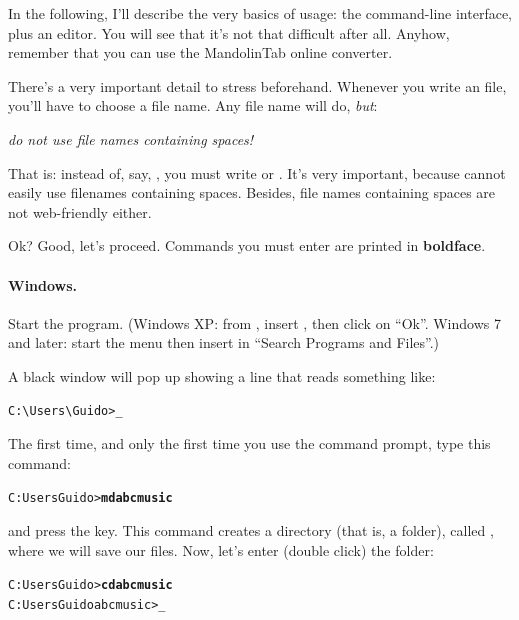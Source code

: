 \documentclass[a4paper,12pt]{book}
\begin{document}
In the following, I'll describe the very basics of \ABC{} usage: the
command-line interface, plus an editor. You will see that it's not
that difficult after all. Anyhow, remember that you can use the
MandolinTab online converter.

There's a very important detail to stress beforehand. Whenever you
write an \ABC{} file, you'll have to choose a file name. Any file name
will do, \emph{but}:

\begin{vimp}

  \emph{do not use file names containing spaces!}

\end{vimp}

That is: instead of, say, , you must write
 or . It's
very important, because \abcm{} cannot easily use filenames containing
spaces. Besides, file names containing spaces are not web-friendly
either.

Ok? Good, let's proceed. Commands you must enter are printed in
\textbf{boldface}.


\paragraph{Windows.}

Start the  program. (Windows XP: from
, insert , then click on ``Ok''.
Windows 7 and later: start the menu then insert  in ``Search
Programs and Files''.)

A black window will pop up showing a line that reads something like:

\begin{verbatim}
C:\Users\Guido>_
\end{verbatim}

The first time, and only the first time you use the command prompt,
type this command:

\begin{alltt}
C:\bl{}Users\bl{}Guido>\textbf{md abcmusic}
\end{alltt}

and press the  key. This command creates a directory (that
is, a folder), called , where we will save our \ABC{}
files. Now, let's enter (double click) the folder:

\begin{alltt}
C:\bl{}Users\bl{}Guido>\textbf{cd abcmusic}
C:\bl{}Users\bl{}Guido\bl{}abcmusic>_
\end{alltt}
\end{document}
